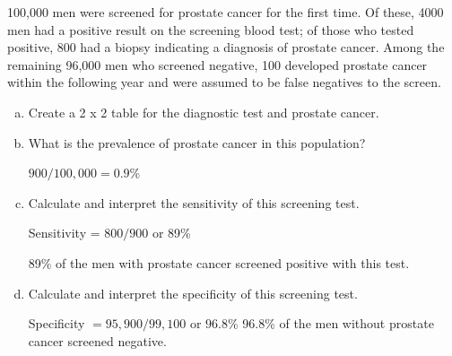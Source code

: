 
100,000 men were screened for prostate cancer for the first time.  Of these, 4000 men had a positive result on the screening blood test; of those who tested positive, 800 had a biopsy indicating a diagnosis of prostate cancer.  Among the remaining 96,000 men who screened negative, 100 developed prostate cancer within the following year and were assumed to be false negatives to the screen.

\begin{enumerate}[(a)]
\item Create a 2 x 2 table for the diagnostic test and prostate cancer.
\answerSpace{3cm}


\item What is the prevalence of prostate cancer in this population?

\begin{AnswerText}
$900/100,000 = 0.9$\%
\end{AnswerText}

\item Calculate and interpret the sensitivity of this screening test.

\begin{AnswerText}
Sensitivity = $800/900$ or 89\%

 89\% of the men with prostate cancer screened positive with this test.
\end{AnswerText}

\item  Calculate and interpret the specificity of this screening test.

\begin{AnswerText}
 Specificity $ = 95,900/99,100$ or $96.8$\%
96.8\% of the men without prostate cancer screened negative.
\end{AnswerText}


\end{enumerate}
